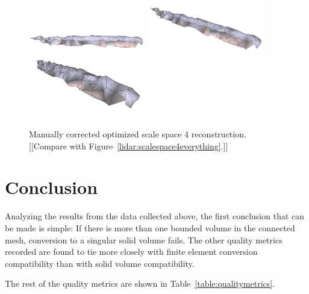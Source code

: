 \documentclass[12pt]{drexelthesis}
\begin{document}
\begin{figure}[!ht]
	\centering
		\includegraphics[width=2in]{real-lab-scans/modmesh/scaleSpace4Modified00.png}
		\includegraphics[width=2in]{real-lab-scans/modmesh/scaleSpace4Modified01.png}
		\includegraphics[width=2in]{real-lab-scans/modmesh/scaleSpace4Modified02.png}
	\caption[Modified optimized surface mesh at scale space 4.]{\centering Manually corrected optimized scale space 4 reconstruction. [[Compare with Figure~\ref{lidar:scalespace4everything}.]]}
	\label{real:modified4}
\end{figure}




















\chapter{Conclusion}
\label{chap:conclusion}

Analyzing the results from the data collected above, the first conclusion that can be made is simple: If there is more than one bounded volume in the connected mesh, conversion to a singular solid volume fails. The other quality metrics recorded are found to tie more closely with finite element conversion compatibility than with solid volume compatibility. 

The rest of the quality metrics are shown in Table~\ref{table:qualitymetrics}.
\end{document}
